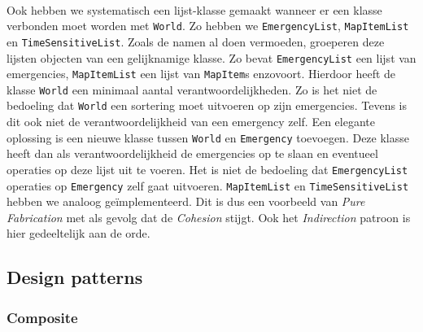 \paragraph{}
Ook hebben we systematisch een lijst-klasse gemaakt wanneer er een klasse verbonden moet worden met \texttt{World}. Zo hebben we \texttt{EmergencyList}, \texttt{MapItemList} en \texttt{TimeSensitiveList}. Zoals de namen al doen vermoeden, groeperen deze lijsten objecten van een gelijknamige klasse. Zo bevat \texttt{EmergencyList} een lijst van emergencies, \texttt{MapItemList} een lijst van \texttt{MapItem}s enzovoort. Hierdoor heeft de klasse \texttt{World} een minimaal aantal verantwoordelijkheden. Zo is het niet de bedoeling dat \texttt{World} een sortering moet uitvoeren op zijn emergencies. Tevens is dit ook niet de verantwoordelijkheid van een emergency zelf. Een elegante oplossing is een nieuwe klasse tussen \texttt{World} en \texttt{Emergency} toevoegen. Deze klasse heeft dan als verantwoordelijkheid de emergencies op te slaan en eventueel operaties op deze lijst uit te voeren. Het is niet de bedoeling dat \texttt{EmergencyList} operaties op \texttt{Emergency} zelf gaat uitvoeren. \texttt{MapItemList} en \texttt{TimeSensitiveList} hebben we analoog ge\"implementeerd. Dit is dus een voorbeeld van \textit{Pure Fabrication} met als gevolg dat de \textit{Cohesion} stijgt. Ook het \textit{Indirection} patroon is hier gedeeltelijk aan de orde.
\subsection{Design patterns}
\subsubsection{Composite}
